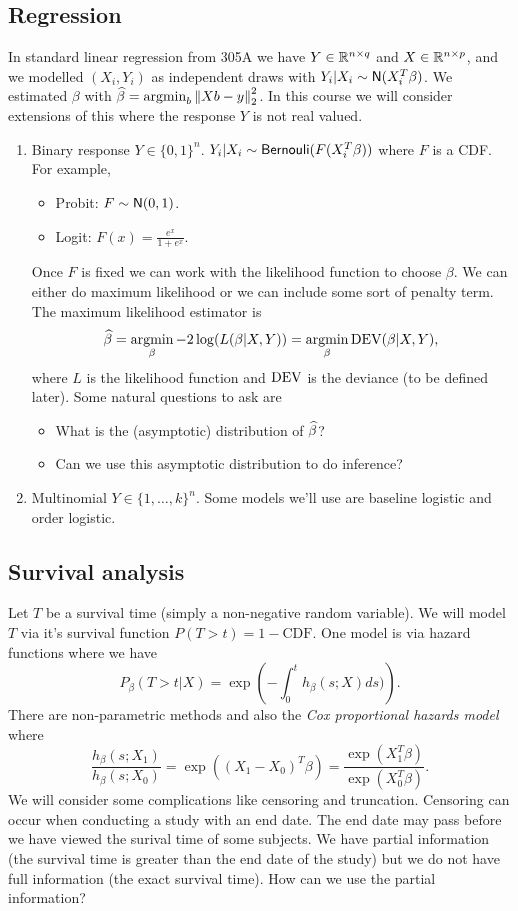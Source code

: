 \subsection{Regression}
In standard linear regression from 305A we have $Y \in {\mathbb R}^{n \times q}$ and $X \in {\mathbb R}^{n \times p}$, and we modelled $(X_i,Y_i)$ as independent draws with $Y_i |X_i \sim \mathsf{N}(X_i^T\beta)$. We estimated $\beta$ with $\widehat{\beta} = \operatorname*{argmin}_b \left\|Xb-y\right\|_2^2$. In this course we will consider extensions of this  where the response $Y$ is not real valued.
\begin{enumerate}
    \item Binary response $Y \in \{0,1\}^n$. $Y_i|X_i \sim \mathsf{Bernouli}(F(X_i^T\beta))$ where $F$ is a CDF. For example,
    \begin{itemize}
        \item Probit: $F \sim \mathsf{N}(0,1)$.
        \item Logit: $F(x) = \frac{e^x}{1+e^x}$.
    \end{itemize}
    Once $F$ is fixed we can work with the likelihood function to choose $\beta$. We can either do maximum likelihood or we can include some sort of penalty term. The maximum likelihood estimator is
    \[\widehat{\beta} = \operatorname*{argmin}_\beta -2\log(L(\beta|X,Y)) = \operatorname*{argmin}_\beta \operatorname{DEV}(\beta | X,Y), \]
    where $L$ is the likelihood function and $\operatorname{DEV}$ is the deviance (to be defined later). Some natural questions to ask are
    \begin{itemize}
        \item What is the (asymptotic) distribution of $\widehat{\beta}$?
        \item Can we  use this asymptotic distribution to do inference?
    \end{itemize}
    \item Multinomial $Y \in \{1,\ldots, k\}^n$. Some models we'll use are baseline logistic and order logistic.
\end{enumerate}
\subsection{Survival analysis}
Let $T$ be a survival time (simply a non-negative random variable). We will model $T$ via it's survival function $P(T > t) = 1-\text{CDF}$. One model is via hazard functions where we have
\[P_\beta(T > t |X) = \exp\left(-\int_0^t h_\beta(s;X)ds)\right). \]
There are non-parametric methods and also the \emph{Cox proportional hazards model} where
\[\frac{h_\beta(s;X_1)}{h_\beta(s;X_0)} = \exp\left((X_1-X_0)^T\beta\right) = \frac{\exp(X_1^T\beta)}{\exp(X_0^T\beta)}. \]
We will consider some complications like censoring and truncation. Censoring can occur when conducting a study with an end date. The end date may pass before we have viewed the surival time of some subjects. We have partial information (the survival time is greater than the end date of the study) but we do not have full information (the exact survival time). How can we use the partial information?
